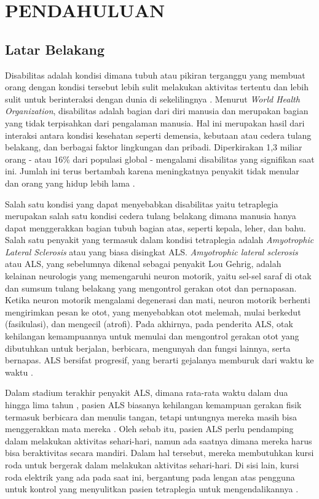 \chapter{PENDAHULUAN}
\label{chap:pendahuluan}


\section{Latar Belakang}
\label{sec:latarbelakang}

Disabilitas adalah kondisi dimana tubuh atau pikiran terganggu yang membuat orang dengan kondisi tersebut lebih sulit melakukan aktivitas tertentu dan lebih sulit untuk berinteraksi dengan dunia di sekelilingnya \parencite{CDC_2020}. Menurut \textit{World Health Organization}, disabilitas adalah bagian dari diri manusia dan merupakan bagian yang tidak terpisahkan dari pengalaman manusia. Hal ini merupakan hasil dari interaksi antara kondisi kesehatan seperti demensia, kebutaan atau cedera tulang belakang, dan berbagai faktor lingkungan dan pribadi. Diperkirakan 1,3 miliar orang - atau 16\% dari populasi global - mengalami disabilitas yang signifikan saat ini. Jumlah ini terus bertambah karena meningkatnya penyakit tidak menular dan orang yang hidup lebih lama \parencite{WHO_2023}.

Salah satu kondisi yang dapat menyebabkan disabilitas yaitu tetraplegia merupakan salah satu kondisi cedera tulang belakang dimana manusia hanya dapat menggerakkan bagian tubuh bagian atas, seperti kepala, leher, dan bahu. Salah satu penyakit yang termasuk dalam kondisi tetraplegia adalah \textit{Amyotrophic Lateral Sclerosis} atau yang biasa disingkat ALS. \textit{Amyotrophic lateral sclerosis} atau ALS, yang sebelumnya dikenal sebagai penyakit Lou Gehrig, adalah kelainan neurologis yang memengaruhi neuron motorik, yaitu sel-sel saraf di otak dan sumsum tulang belakang yang mengontrol gerakan otot dan pernapasan. Ketika neuron motorik mengalami degenerasi dan mati, neuron motorik berhenti mengirimkan pesan ke otot, yang menyebabkan otot melemah, mulai berkedut (fasikulasi), dan mengecil (atrofi). Pada akhirnya, pada penderita ALS, otak kehilangan kemampuannya untuk memulai dan mengontrol gerakan otot yang dibutuhkan untuk berjalan, berbicara, mengunyah dan fungsi lainnya, serta bernapas. ALS bersifat progresif, yang berarti gejalanya memburuk dari waktu ke waktu \parencite{NINDS}. 

Dalam stadium terakhir penyakit ALS, dimana rata-rata waktu dalam dua hingga lima tahun \parencite{ALS_2023}, pasien ALS biasanya kehilangan kemampuan gerakan fisik termasuk berbicara dan menulis tangan, tetapi untungnya mereka masih bisa menggerakkan mata mereka \parencite{Eyesay_2023}. Oleh sebab itu, pasien ALS perlu pendamping dalam melakukan aktivitas sehari-hari, namun ada saatnya dimana mereka harus bisa beraktivitas secara mandiri. Dalam hal tersebut, mereka membutuhkan kursi roda untuk bergerak dalam melakukan aktivitas sehari-hari. Di sisi lain, kursi roda elektrik yang ada pada saat ini, bergantung pada lengan atas pengguna untuk kontrol yang menyulitkan pasien tetraplegia untuk mengendalikannya \parencite{9935646}. 

